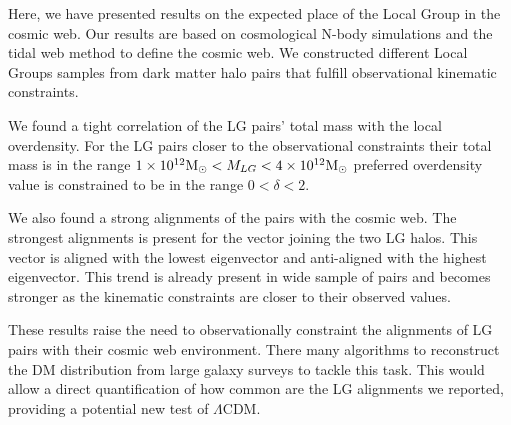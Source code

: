 \documentclass{iau}
\newcommand{\Msun}{{\ifmmode{{\rm {M_{\odot}}}}\else{${\rm{M_{\odot}}}$}\fi}}
\begin{document}
Here, we have presented results on the expected place of the Local
Group in the cosmic web. Our results are based on cosmological N-body
simulations and the tidal web method to define the cosmic web. We
constructed different Local Groups samples from dark matter halo pairs
that fulfill observational kinematic constraints. 

We found a tight correlation of the LG pairs' total mass with the
local overdensity. For the LG pairs closer to the observational
constraints their total mass is in the range $1\times 10^{12}\Msun <
M_{LG} < 4\times 10^{12}\Msun$ preferred overdensity value is
constrained to be in the range $0<\delta <2$. 

We also found a strong alignments of the pairs with the cosmic web. The
strongest alignments is present for the vector joining the two LG
halos. This vector is aligned with the lowest eigenvector and
anti-aligned with the highest eigenvector. This trend is already
present in wide sample of pairs and becomes stronger as the kinematic
constraints are closer to their observed values. 


These results  raise the need to observationally constraint
the alignments of LG pairs with their cosmic web environment. There
many algorithms to reconstruct the DM distribution from large galaxy
surveys to tackle this task.  This would allow a direct
quantification of how common are the LG alignments we reported,
providing a potential new test of $\Lambda$CDM. 




 
\end{document}
